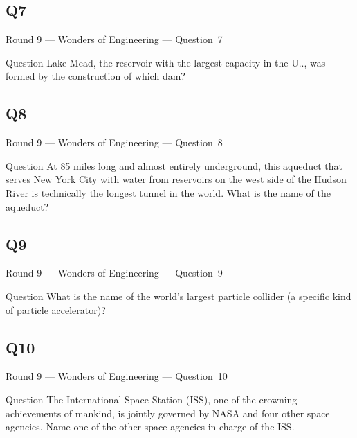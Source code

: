 \documentclass[11pt]{beamer}
\begin{document}
\subsection*{Q7}
\begin{frame}[t]{Round 9 --- Wonders of Engineering --- \mbox{Question 7}}
\vspace{-0.5em}
\begin{block}{Question}
Lake Mead, the reservoir with the largest capacity in the U.\@S.\@, was formed by the construction of which dam?
\end{block}
\end{frame}
\subsection*{Q8}
\begin{frame}[t]{Round 9 --- Wonders of Engineering --- \mbox{Question 8}}
\vspace{-0.5em}
\begin{block}{Question}
At 85 miles long and almost entirely underground, this aqueduct that serves New York City with water from reservoirs on the west side of the Hudson River is technically the longest tunnel in the world. What is the name of the aqueduct?
\end{block}
\end{frame}
\subsection*{Q9}
\begin{frame}[t]{Round 9 --- Wonders of Engineering --- \mbox{Question 9}}
\vspace{-0.5em}
\begin{block}{Question}
What is the name of the world's largest particle collider (a specific kind of particle accelerator)?
\end{block}
\end{frame}
\subsection*{Q10}
\begin{frame}[t]{Round 9 --- Wonders of Engineering --- \mbox{Question 10}}
\vspace{-0.5em}
\begin{block}{Question}
The International Space Station (ISS), one of the crowning achievements of mankind, is jointly governed by NASA and four other space agencies. Name one of the other space agencies in charge of the ISS.\@
\end{block}
\end{frame}
\end{document}
